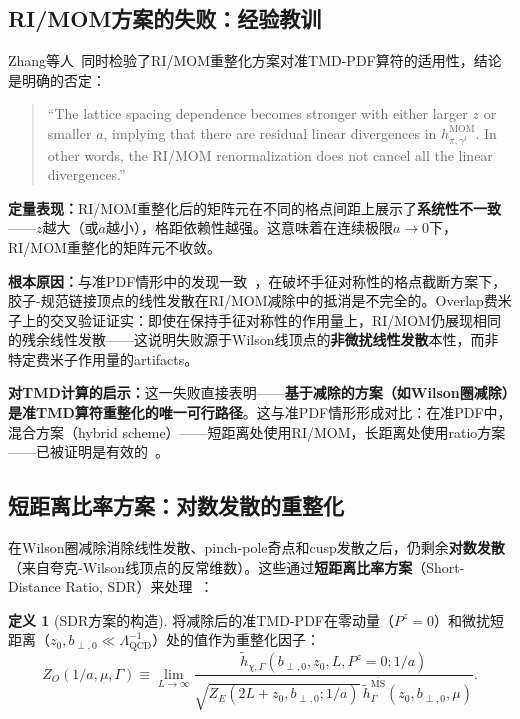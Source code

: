 \documentclass[12pt,a4paper]{ctexart}
\theoremstyle{definition}
\newtheorem{definition}{定义}[section]
\begin{document}
\subsection{RI/MOM方案的失败：经验教训}

Zhang等人~\cite{Zhang2022renormTMD}同时检验了RI/MOM重整化方案对准TMD-PDF算符的适用性，结论是明确的否定：

\begin{quote}
``The lattice spacing dependence becomes stronger with either larger $z$ or smaller $a$, implying that there are residual linear divergences in $h^{\text{MOM}}_{\pi,\gamma^t}$. In other words, the RI/MOM renormalization does not cancel all the linear divergences.''~\cite{Zhang2022renormTMD}
\end{quote}

\textbf{定量表现：}RI/MOM重整化后的矩阵元在不同的格点间距上展示了\textbf{系统性不一致}——$z$越大（或$a$越小），格距依赖性越强。这意味着在连续极限$a\to 0$下，RI/MOM重整化的矩阵元不收敛。

\textbf{根本原因：}与准PDF情形中的发现一致~\cite{Huo2021self}，在破坏手征对称性的格点截断方案下，胶子-规范链接顶点的线性发散在RI/MOM减除中的抵消是不完全的。Overlap费米子上的交叉验证证实：即使在保持手征对称性的作用量上，RI/MOM仍展现相同的残余线性发散——这说明失败源于Wilson线顶点的\textbf{非微扰线性发散}本性，而非特定费米子作用量的artifacts。

\textbf{对TMD计算的启示：}这一失败直接表明——\textbf{基于减除的方案（如Wilson圈减除）是准TMD算符重整化的唯一可行路径}。这与准PDF情形形成对比：在准PDF中，混合方案（hybrid scheme）——短距离处使用RI/MOM，长距离处使用ratio方案——已被证明是有效的~\cite{Huo2021self}。

\subsection{短距离比率方案：对数发散的重整化}

在Wilson圈减除消除线性发散、pinch-pole奇点和cusp发散之后，仍剩余\textbf{对数发散}（来自夸克-Wilson线顶点的反常维数）。这些通过\textbf{短距离比率方案}（Short-Distance Ratio, SDR）来处理~\cite{He2024unpolTMD,Zhang2022renormTMD}：

\begin{definition}[SDR方案的构造]
将减除后的准TMD-PDF在零动量（$P^z=0$）和微扰短距离（$z_0, b_{\perp,0} \ll \Lambda_{\text{QCD}}^{-1}$）处的值作为重整化因子：
\begin{equation}
Z_O(1/a, \mu, \Gamma) \equiv \lim_{L\to\infty} \frac{\tilde{h}_{\chi,\Gamma}(b_{\perp,0}, z_0, L, P^z=0; 1/a)}{\sqrt{Z_E(2L+z_0, b_{\perp,0}; 1/a)} \, \tilde{h}^{\overline{\text{MS}}}_\Gamma(z_0, b_{\perp,0}, \mu)}.
\label{eq:SDR_factor}
\end{equation}
\end{definition}
\end{document}
